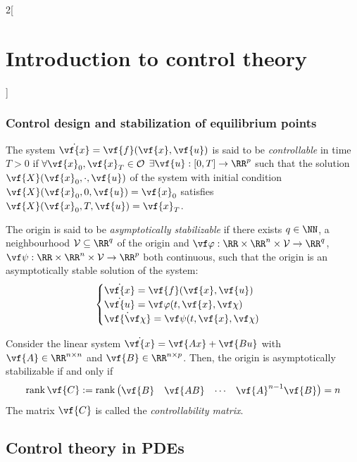 \documentclass[../../../main_math.tex]{subfiles}
\begin{document}
\begin{multicols}{2}[\section{Introduction to control theory}]
  \subsubsection{Control design and stabilization of equilibrium points}
  \begin{definition}
    The system $\dot{\vf{x}} = \vf{f}(\vf{x}, \vf{u})$ is said to be \emph{controllable} in time $T>0$ if $\forall \vf{x}_0, \vf{x}_T\in \mathcal{O}$ $\exists \vf{u}: [0, T]\to \RR^p$ such that the solution $\vf{X}(\vf{x}_0,\cdot, \vf{u})$ of the system with initial condition $\vf{X}(\vf{x}_0, 0,\vf{u}) = \vf{x}_0$ satisfies $\vf{X}(\vf{x}_0, T,\vf{u}) = \vf{x}_T$.
  \end{definition}
  \begin{definition}
    The origin is said to be \emph{asymptotically stabilizable} if there exists $q\in \NN$, a neighbourhood $\mathcal{V}\subseteq \RR^q$ of the origin and $\vf\varphi:\RR\times\RR^n\times\mathcal{V}\to \RR^q$, $\vf\psi:\RR\times\RR^n\times\mathcal{V}\to \RR^p$ both continuous, such that the origin is an asymptotically stable solution of the system:
    $$
      \begin{cases}
        \dot{\vf{x}} = \vf{f}(\vf{x}, \vf{u})         \\
        \dot{\vf{u}} = \vf\varphi(t, \vf{x}, \vf\chi) \\
        \dot{\vf{\vf\chi}} = \vf\psi(t, \vf{x}, \vf\chi)
      \end{cases}
    $$
  \end{definition}
  \begin{theorem}
    Consider the linear system $\dot{\vf{x}} = \vf{Ax} + \vf{Bu}$ with $\vf{A}\in \RR^{n\times n}$ and $\vf{B}\in \RR^{n\times p}$. Then, the origin is asymptotically stabilizable if and only if
    $$
      \rank\vf{C}:=\rank\begin{pmatrix} \vf{B} & \vf{AB} & \cdots & \vf{A}^{n-1}\vf{B} \end{pmatrix} = n
    $$
    The matrix $\vf{C}$ is called the \emph{controllability matrix}.
  \end{theorem}

  \subsection{Control theory in PDEs}
\end{multicols}
\end{document}
